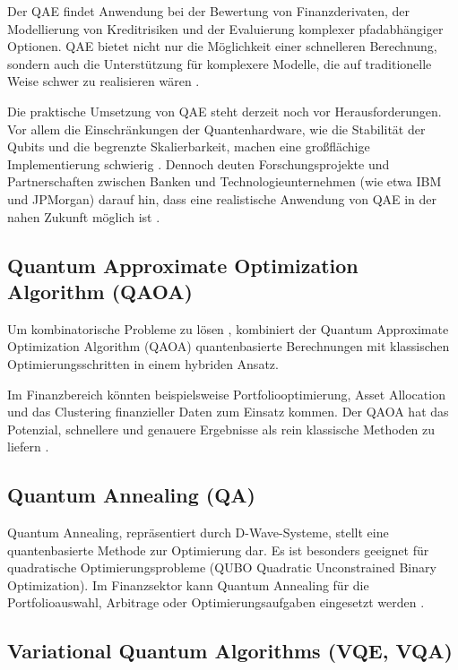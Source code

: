 Der QAE findet Anwendung bei der Bewertung von Finanzderivaten, der Modellierung von Kreditrisiken und der Evaluierung komplexer pfadabhängiger Optionen. QAE bietet nicht nur die Möglichkeit einer schnelleren Berechnung, sondern auch die Unterstützung für komplexere Modelle, die auf traditionelle Weise schwer zu realisieren wären \cite{orus2018,egger2020,rebentrost2018}.

Die praktische Umsetzung von QAE steht derzeit noch vor Herausforderungen. Vor allem die Einschränkungen der Quantenhardware, wie die Stabilität der Qubits und die begrenzte Skalierbarkeit, machen eine großflächige Implementierung schwierig \cite{bouland2020,martin2022}. Dennoch deuten Forschungsprojekte und Partnerschaften zwischen Banken und Technologieunternehmen (wie etwa IBM und JPMorgan) darauf hin, dass eine realistische Anwendung von QAE in der nahen Zukunft möglich ist \cite{egger2020}.

\subsection{Quantum Approximate Optimization Algorithm (QAOA)}

Um kombinatorische Probleme zu lösen \cite{orus2019,bouland2020}, kombiniert der Quantum Approximate Optimization Algorithm (QAOA) quantenbasierte Berechnungen mit klassischen Optimierungsschritten in einem hybriden Ansatz.

Im Finanzbereich könnten beispielsweise Portfoliooptimierung, Asset Allocation und das Clustering finanzieller Daten zum Einsatz kommen. Der QAOA hat das Potenzial, schnellere und genauere Ergebnisse als rein klassische Methoden zu liefern \cite{orus2019}.

\subsection{Quantum Annealing (QA)}

Quantum Annealing, repräsentiert durch D-Wave-Systeme, stellt eine quantenbasierte Methode zur Optimierung dar. Es ist besonders geeignet für quadratische Optimierungsprobleme (QUBO   Quadratic Unconstrained Binary Optimization). Im Finanzsektor kann Quantum Annealing für die Portfolioauswahl, Arbitrage oder Optimierungsaufgaben eingesetzt werden \cite{orus2019,bouland2020}.

\subsection{Variational Quantum Algorithms (VQE, VQA)}

